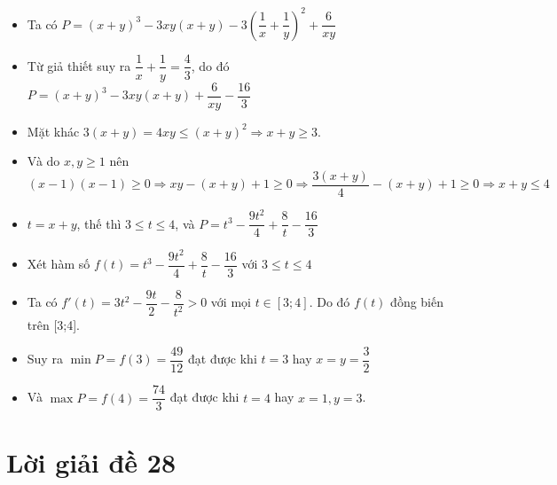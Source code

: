 \lgi 
\begin{itemize}[label=,leftmargin=*]
\item Ta có $P=(x+y)^3-3xy(x+y)-3\left(\dfrac{1}{x}+\dfrac{1}{y} \right)^2+\dfrac{6}{xy}$
\item Từ giả thiết suy ra $\dfrac{1}{x}+\dfrac{1}{y}=\dfrac{4}{3}$, do đó $P=(x+y)^3-3xy(x+y)+\dfrac{6}{xy}-\dfrac{16}{3}$
\item Mặt khác $3(x+y)=4xy \le (x+y)^2 \Rightarrow x+y\ge 3$. 
\item Và do $x,y\ge 1$ nên $(x-1)(x-1)\ge 0 \Rightarrow xy-(x+y)+1\ge 0\Rightarrow \dfrac{3(x+y)}{4}-(x+y)+1\ge 0 \Rightarrow x+y\le 4$
\item $t=x+y$, thế thì $3\le t\le 4$, và $P=t^3-\dfrac{9t^2}{4}+\dfrac{8}{t}-\dfrac{16}{3}$
\item Xét hàm số $f(t)=t^3-\dfrac{9t^2}{4}+\dfrac{8}{t}-\dfrac{16}{3}$ với $3\le t\le 4$
\item Ta có $f'(t)=3t^2-\dfrac{9t}{2}-\dfrac{8}{t^2}>0$ với mọi $t\in [3;4]$. Do đó $f(t)$ đồng biến trên [3;4].
\item Suy ra $\min P=f(3)=\dfrac{49}{12}$ đạt được khi $t=3$ hay $x=y=\dfrac{3}{2}$
\item Và $\max P=f(4)=\dfrac{74}{3}$ đạt được khi $t=4$ hay $x=1,y=3$.
\end{itemize}

\section{Lời giải đề 28}


